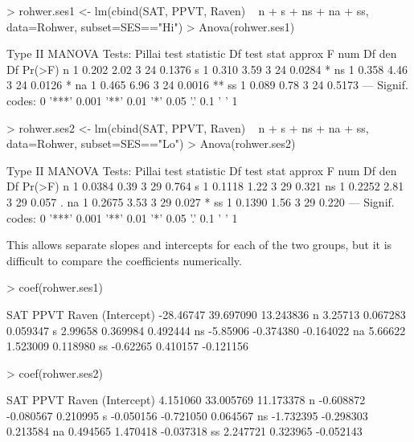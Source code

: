 \documentclass[11pt]{article}
\begin{document}
\begin{Schunk}
\begin{Sinput}
> rohwer.ses1 <- lm(cbind(SAT, PPVT, Raven) ~ n + s + ns + na + ss, data=Rohwer, subset=SES=="Hi")
> Anova(rohwer.ses1)
\end{Sinput}
\begin{Soutput}
Type II MANOVA Tests: Pillai test statistic
   Df test stat approx F num Df den Df Pr(>F)   
n   1     0.202     2.02      3     24 0.1376   
s   1     0.310     3.59      3     24 0.0284 * 
ns  1     0.358     4.46      3     24 0.0126 * 
na  1     0.465     6.96      3     24 0.0016 **
ss  1     0.089     0.78      3     24 0.5173   
---
Signif. codes:  0 '***' 0.001 '**' 0.01 '*' 0.05 '.' 0.1 ' ' 1 
\end{Soutput}
\begin{Sinput}
> rohwer.ses2 <- lm(cbind(SAT, PPVT, Raven) ~ n + s + ns + na + ss, data=Rohwer, subset=SES=="Lo")
> Anova(rohwer.ses2)
\end{Sinput}
\begin{Soutput}
Type II MANOVA Tests: Pillai test statistic
   Df test stat approx F num Df den Df Pr(>F)  
n   1    0.0384     0.39      3     29  0.764  
s   1    0.1118     1.22      3     29  0.321  
ns  1    0.2252     2.81      3     29  0.057 .
na  1    0.2675     3.53      3     29  0.027 *
ss  1    0.1390     1.56      3     29  0.220  
---
Signif. codes:  0 '***' 0.001 '**' 0.01 '*' 0.05 '.' 0.1 ' ' 1 
\end{Soutput}
\end{Schunk}
This allows separate slopes and intercepts for each of the two groups, but it is difficult
to compare the coefficients numerically.
\begin{Schunk}
\begin{Sinput}
> coef(rohwer.ses1)
\end{Sinput}
\begin{Soutput}
                  SAT      PPVT     Raven
(Intercept) -28.46747 39.697090 13.243836
n             3.25713  0.067283  0.059347
s             2.99658  0.369984  0.492444
ns           -5.85906 -0.374380 -0.164022
na            5.66622  1.523009  0.118980
ss           -0.62265  0.410157 -0.121156
\end{Soutput}
\begin{Sinput}
> coef(rohwer.ses2)
\end{Sinput}
\begin{Soutput}
                  SAT      PPVT     Raven
(Intercept)  4.151060 33.005769 11.173378
n           -0.608872 -0.080567  0.210995
s           -0.050156 -0.721050  0.064567
ns          -1.732395 -0.298303  0.213584
na           0.494565  1.470418 -0.037318
ss           2.247721  0.323965 -0.052143
\end{Soutput}
\end{Schunk}
\end{document}
